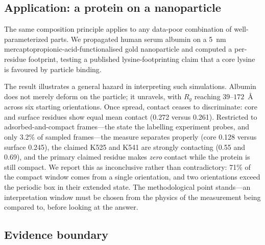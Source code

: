 \documentclass[journal=jctcce,manuscript=article,layout=twocolumn]{achemso}
\begin{document}
\subsection{Application: a protein on a nanoparticle}
\label{sec:np}

The same composition principle applies to any data-poor combination of
well-parameterized parts. We propagated human serum albumin on a 5~nm
mercaptopropionic-acid-functionalised gold nanoparticle and computed a per-residue
footprint, testing a published lysine-footprinting claim that a core lysine is
favoured by particle binding.

The result illustrates a general hazard in interpreting such simulations. Albumin
does not merely deform on the particle; it unravels, with $R_g$ reaching
$39$--$172$~\AA{} across six starting orientations. Once spread, contact ceases to
discriminate: core and surface residues show equal mean contact (0.272 versus 0.261).
Restricted to adsorbed-and-compact frames---the state the labelling experiment
probes, and only 3.2\% of sampled frames---the measure separates properly (core 0.128
versus surface 0.245), the claimed K525 and K541 are strongly contacting (0.55 and
0.69), and the primary claimed residue makes \emph{zero} contact while the protein is
still compact. We report this as inconclusive rather than contradictory: 71\% of the
compact window comes from a single orientation, and two orientations exceed the
periodic box in their extended state. The methodological point stands---an
interpretation window must be chosen from the physics of the measurement being
compared to, before looking at the answer.

\subsection{Evidence boundary}
\label{sec:evidence}
\end{document}
